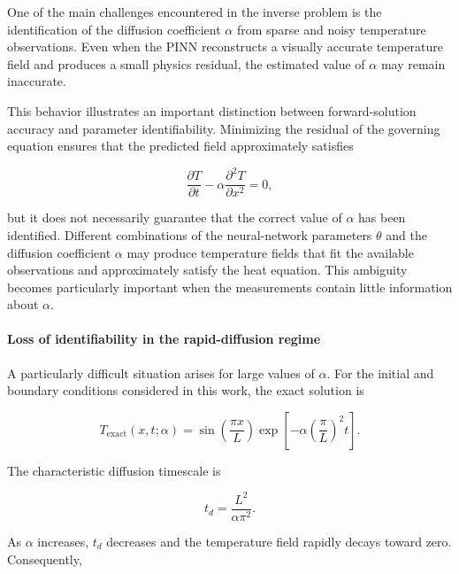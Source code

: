 One of the main challenges encountered in the inverse problem is the
identification of the diffusion coefficient $\alpha$ from sparse and noisy
temperature observations. Even when the PINN reconstructs a visually accurate
temperature field and produces a small physics residual, the estimated value of
$\alpha$ may remain inaccurate.

This behavior illustrates an important distinction between forward-solution
accuracy and parameter identifiability. Minimizing the residual of the governing
equation ensures that the predicted field approximately satisfies

\begin{equation}
\frac{\partial T}{\partial t}
-
\alpha
\frac{\partial^2 T}{\partial x^2}
=
0,
\end{equation}

but it does not necessarily guarantee that the correct value of $\alpha$ has
been identified. Different combinations of the neural-network parameters
$\theta$ and the diffusion coefficient $\alpha$ may produce temperature fields
that fit the available observations and approximately satisfy the heat
equation. This ambiguity becomes particularly important when the measurements
contain little information about $\alpha$.

\paragraph{Loss of identifiability in the rapid-diffusion regime}

A particularly difficult situation arises for large values of $\alpha$. For the
initial and boundary conditions considered in this work, the exact solution is

\begin{equation}
T_{\mathrm{exact}}(x,t;\alpha)
=
\sin\left(\frac{\pi x}{L}\right)
\exp\left[
-\alpha
\left(\frac{\pi}{L}\right)^2t
\right].
\end{equation}

The characteristic diffusion timescale is

\begin{equation}
t_d
=
\frac{L^2}{\alpha\pi^2}.
\end{equation}

As $\alpha$ increases, $t_d$ decreases and the temperature field rapidly decays
toward zero. Consequently,

